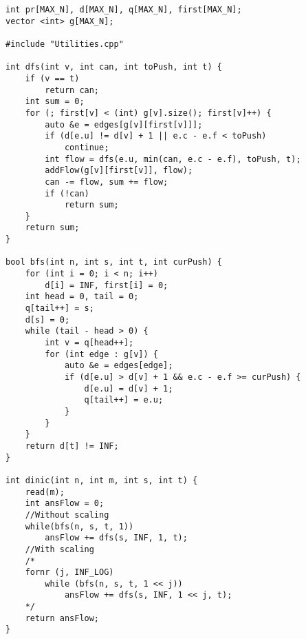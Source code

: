 \begin{verbatim}
int pr[MAX_N], d[MAX_N], q[MAX_N], first[MAX_N];
vector <int> g[MAX_N];

#include "Utilities.cpp"

int dfs(int v, int can, int toPush, int t) {
	if (v == t)
		return can;
	int sum = 0;
	for (; first[v] < (int) g[v].size(); first[v]++) {
		auto &e = edges[g[v][first[v]]];
		if (d[e.u] != d[v] + 1 || e.c - e.f < toPush)
			continue;
		int flow = dfs(e.u, min(can, e.c - e.f), toPush, t);
		addFlow(g[v][first[v]], flow);
		can -= flow, sum += flow;
		if (!can)
			return sum;
	}
	return sum;
}

bool bfs(int n, int s, int t, int curPush) {
	for (int i = 0; i < n; i++)
		d[i] = INF, first[i] = 0;
	int head = 0, tail = 0;
	q[tail++] = s;
	d[s] = 0;
	while (tail - head > 0) {
		int v = q[head++];
		for (int edge : g[v]) {
			auto &e = edges[edge];
			if (d[e.u] > d[v] + 1 && e.c - e.f >= curPush) {
				d[e.u] = d[v] + 1;
				q[tail++] = e.u;
			}
		}
	}
	return d[t] != INF;
}
			  
int dinic(int n, int m, int s, int t) {
	read(m);
	int ansFlow = 0;
	//Without scaling
	while(bfs(n, s, t, 1))
		ansFlow += dfs(s, INF, 1, t);
	//With scaling
	/*
	fornr (j, INF_LOG)
		while (bfs(n, s, t, 1 << j))
			ansFlow += dfs(s, INF, 1 << j, t);
	*/
	return ansFlow;
}
\end{verbatim}
